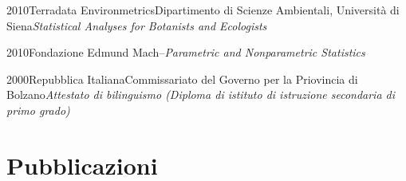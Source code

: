 \documentclass{curriculum}
\begin{document}
    \begin{entrylist}
    \entry
        {2010}{Terradata Environmetrics}{Dipartimento di Scienze Ambientali, Università di Siena}{\emph{Statistical Analyses for Botanists and Ecologists}}
    \end{entrylist}
    
    \begin{entrylist}
    \entry
        {2010}{Fondazione Edmund Mach}{--}{\emph{Parametric and Nonparametric Statistics}}
    \end{entrylist}
    
    \begin{entrylist}
    \entry
        {2000}{Repubblica Italiana}{Commissariato del Governo per la Priovincia di Bolzano}{\emph{Attestato di bilinguismo (Diploma di istituto di istruzione secondaria di primo grado)}}
    \end{entrylist}
    \newpage
    \section{Pubblicazioni}
    \begin{refsection}
        \nocite{*}
        \newrefcontext[sorting=ydnt]
        \printbibliography[type=article, title={Riviste peer-review}, heading=subbibliography, notkeyword=divulgative]
    \end{refsection}
    \vspace{2mm}
    \begin{refsection}
        \nocite{*}
        \newrefcontext[sorting=ydnt]
        \printbibliography[type=incollection, notkeyword=report, title={Capitoli di libro}, heading=subbibliography]
    \end{refsection}
    \vspace{2mm} 
    \begin{refsection}
        \nocite{*}
        \newrefcontext[sorting=ydnt]
        \printbibliography[type=inproceedings, title={Atti di convegno}, heading=subbibliography]
    \end{refsection}
    
     \begin{refsection}
        \nocite{*}
        \newrefcontext[sorting=ydnt]
        \printbibliography[type=incollection, keyword=report, title={Report tecnici}, heading=subbibliography]
    \end{refsection}       
    
     \begin{refsection}
        \nocite{*}
        \newrefcontext[sorting=ydnt]
        \printbibliography[type=article, title={Articoli divulgativi}, keyword=divulgative, heading=subbibliography]
    \end{refsection}    
    
    
\end{document}
